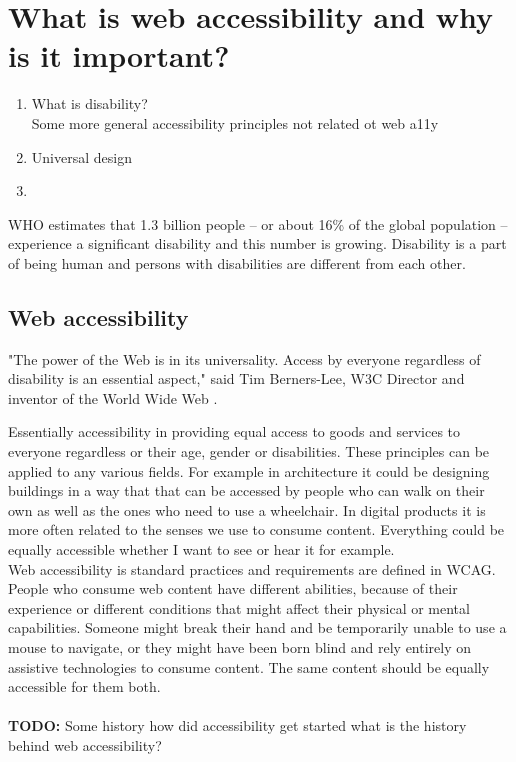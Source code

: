 \documentclass{master_thesis_section}
\begin{document}
\section{What is web accessibility and why is it important?}

\begin{enumerate}
	\item What is disability? \\
	Some more general accessibility principles not related ot web a11y
	\item Universal design
	\item
\end{enumerate}

WHO estimates that 1.3 billion people – or about 16\% of the global population – experience a significant disability and this number is growing. Disability is a part of being human and persons with disabilities are different from each other. \citep{WHODisability2022} \\


\subsection{Web accessibility}

"The power of the Web is in its universality. Access by everyone regardless of disability is an essential aspect," said Tim Berners-Lee, W3C Director and inventor of the World Wide Web \citep{WWWC1997}.

Essentially accessibility in providing equal access to goods and services to everyone regardless or their age, gender or disabilities. These principles can be applied to any various fields. For example in architecture it could be designing buildings in a way that that can be accessed by people who can walk on their own as well as the ones who need to use a wheelchair. In digital products it is more often related to the senses we use to consume content. Everything could be equally accessible whether I want to see or hear it for example. \\
Web accessibility is standard practices and requirements are defined in WCAG. People who consume web content have different abilities, because of their experience or different conditions that might affect their physical or mental capabilities. Someone might break their hand and be temporarily unable to use a mouse to navigate, or they might have been born blind and rely entirely on assistive technologies to consume content. The same content should be equally accessible for them both.
\\ \\ \textbf{TODO:} Some history how did accessibility get started what is the history behind web accessibility?
\end{document}
